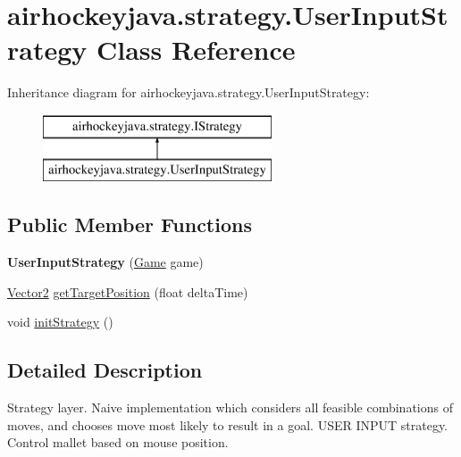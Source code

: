 \hypertarget{classairhockeyjava_1_1strategy_1_1_user_input_strategy}{}\section{airhockeyjava.\+strategy.\+User\+Input\+Strategy Class Reference}
\label{classairhockeyjava_1_1strategy_1_1_user_input_strategy}
Inheritance diagram for airhockeyjava.\+strategy.\+User\+Input\+Strategy\+:\begin{figure}[H]
\begin{center}
\leavevmode
\includegraphics[height=2.000000cm]{classairhockeyjava_1_1strategy_1_1_user_input_strategy}
\end{center}
\end{figure}
\subsection*{Public Member Functions}
\begin{DoxyCompactItemize}
\item 
\hypertarget{classairhockeyjava_1_1strategy_1_1_user_input_strategy_a4ecf396ef3888a79580eca7870f35d53}{}{\bfseries User\+Input\+Strategy} (\hyperlink{classairhockeyjava_1_1game_1_1_game}{Game} game)\label{classairhockeyjava_1_1strategy_1_1_user_input_strategy_a4ecf396ef3888a79580eca7870f35d53}

\item 
\hyperlink{classairhockeyjava_1_1util_1_1_vector2}{Vector2} \hyperlink{classairhockeyjava_1_1strategy_1_1_user_input_strategy_ad46bf58719bfae0f6134458c0901b18a}{get\+Target\+Position} (float delta\+Time)
\item 
void \hyperlink{classairhockeyjava_1_1strategy_1_1_user_input_strategy_abfc82d3a4457e6ec07fce1b1a0ff9abc}{init\+Strategy} ()
\end{DoxyCompactItemize}


\subsection{Detailed Description}
Strategy layer. Naive implementation which considers all feasible combinations of moves, and chooses move most likely to result in a goal. U\+S\+E\+R I\+N\+P\+U\+T strategy. Control mallet based on mouse position.

